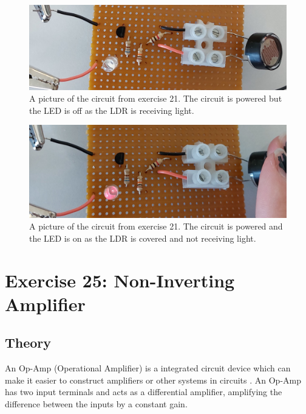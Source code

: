 \documentclass[%
reprint,
amsmath,amssymb,
aps,
floatfix
]{revtex4-2}
\begin{document}
		\begin{figure}
			\includegraphics[width=0.85\columnwidth]{ex21Off.jpg}
			\caption{\label{fig:ex21Off}A picture of the circuit from exercise 21. The circuit is powered but the LED is off as the LDR is receiving light.}
		\end{figure}
		\begin{figure}
			\includegraphics[width=0.85\columnwidth]{ex21On.jpg}
			\caption{\label{fig:ex21On}A picture of the circuit from exercise 21. The circuit is powered and the LED is on as the LDR is covered and not receiving light.}
		\end{figure}
		
	\section{Exercise 25: Non-Inverting Amplifier}
		\subsection{Theory}
		An Op-Amp (Operational Amplifier) is a integrated circuit device which can make it easier to construct amplifiers or other systems in circuits \cite{manual}. An Op-Amp has two input terminals and acts as a differential amplifier, amplifying the difference between the inputs by a constant gain.\\
		
\end{document}
